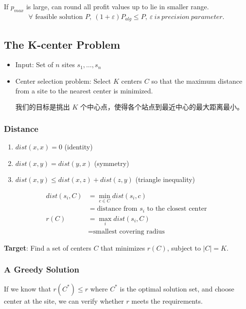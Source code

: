 \documentclass{article}
\begin{document}
If $p_{max}$ is large, can round all profit values up to lie in smaller range. 
\begin{align*}
    \forall \text{ feasible solution }P,\ (1+\varepsilon)P_{alg}\le P , \ \varepsilon \ is \ precision \ parameter. 
\end{align*}

\subsection{The K-center Problem}

\begin{itemize}
    \item Input: Set of $n$ sites $s_1, \dots, s_n$
    \item Center selection problem: Select $K$ centers $C$ so that the maximum distance from a site to the nearest center is minimized.\par
    我们的目标是挑出 $K$ 个中心点，使得各个站点到最近中心的最大距离最小。
\end{itemize}

\subsubsection{Distance}
\begin{enumerate}
    \item  $dist(x, x) = 0$ (identity)
    \item $dist(x, y) = dist(y, x)$ (symmetry)
    \item $dist(x, y) \le dist(x, z) + dist(z, y)$ (triangle inequality)
\end{enumerate}
\begin{align*}
    dist(s_i , C) &= \min_{c\in C} dist(s_i, c)  \\
    &= \text{distance from $s_i$ to the closest center}\\
    r(C) &= \max_i dist(s_i, C) \\
    &= \text{smallest covering radius}
\end{align*}

\textbf{Target}: Find a set of centers $C$ that minimizes $r(C)$, subject to $|C| = K$.


\subsubsection{A Greedy Solution}
If we know that $r(C^*) \le r$ where $C^*$ is the optimal solution set, and choose center at  the site, we can verify whether $r$ meets the requirements. 
\end{document}
